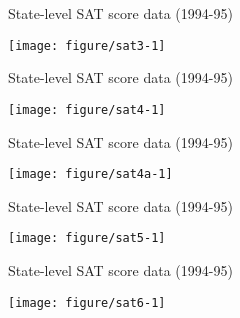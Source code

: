 \documentclass[table]{beamer}\usepackage[]{graphicx}\usepackage[]{color}
\makeatletter
\def\maxwidth{ %
  \ifdim\Gin@nat@width>\linewidth
    \linewidth
  \else
    \Gin@nat@width
  \fi
}
\newenvironment{knitrout}{}{} %
\makeatother
\begin{document}



\begin{frame}[fragile]{State-level SAT score data (1994-95)}

\begin{knitrout}
\color{fgcolor}
\texttt{[image: figure/sat3-1]} 
\end{knitrout}


\end{frame}


\begin{frame}[fragile]{State-level SAT score data (1994-95)}

\begin{knitrout}
\color{fgcolor}
\texttt{[image: figure/sat4-1]} 
\end{knitrout}

\end{frame}




\begin{frame}[fragile]{State-level SAT score data (1994-95)}

\begin{knitrout}
\color{fgcolor}
\texttt{[image: figure/sat4a-1]} 
\end{knitrout}

\end{frame}



\begin{frame}[fragile]{State-level SAT score data (1994-95)}

\begin{knitrout}
\color{fgcolor}
\texttt{[image: figure/sat5-1]} 
\end{knitrout}

\end{frame}



\begin{frame}[fragile]{State-level SAT score data (1994-95)}

\begin{knitrout}
\color{fgcolor}
\texttt{[image: figure/sat6-1]} 
\end{knitrout}

\end{frame}
\end{document}
